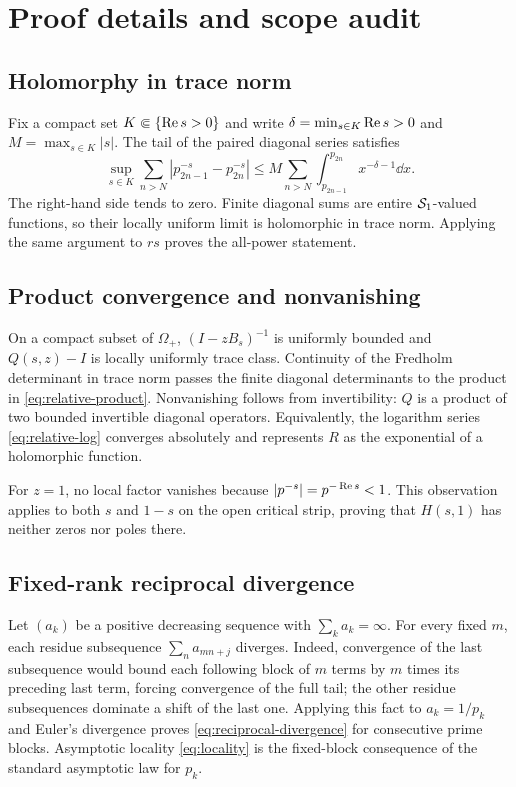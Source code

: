 \section{Proof details and scope audit}
\label{app:proofs}

\subsection{Holomorphy in trace norm}

Fix a compact set $K\Subset\{\operatorname{Re} s>0\}$ and write
$\delta=\min_{s\in K}\operatorname{Re} s>0$ and $M=\max_{s\in K}|s|$.  The tail of the
paired diagonal series satisfies
\[
 \sup_{s\in K}\sum_{n>N}|p_{2n-1}^{-s}-p_{2n}^{-s}|
 \le M\sum_{n>N}\int_{p_{2n-1}}^{p_{2n}}x^{-\delta-1}\dd x.       \tag{A.1}
\]
The right-hand side tends to zero.  Finite diagonal sums are entire
$\mathcal S_1$-valued functions, so their locally uniform limit is holomorphic in
trace norm.  Applying the same argument to $rs$ proves the all-power statement.

\subsection{Product convergence and nonvanishing}

On a compact subset of $\Omega_+$, $(I-zB_s)^{-1}$ is uniformly bounded and
$Q(s,z)-I$ is locally uniformly trace class.  Continuity of the Fredholm
determinant in trace norm passes the finite diagonal determinants to the
product in \cref{eq:relative-product}.  Nonvanishing follows from invertibility:
$Q$ is a product of two bounded invertible diagonal operators.  Equivalently,
the logarithm series \cref{eq:relative-log} converges absolutely and represents
$R$ as the exponential of a holomorphic function.

For $z=1$, no local factor vanishes because
$|p^{-s}|=p^{-\operatorname{Re} s}<1$.  This observation applies to both $s$ and $1-s$
on the open critical strip, proving that $H(s,1)$ has neither zeros nor poles
there.

\subsection{Fixed-rank reciprocal divergence}

Let $(a_k)$ be a positive decreasing sequence with $\sum_ka_k=\infty$.
For every fixed $m$, each residue subsequence
$\sum_na_{mn+j}$ diverges.  Indeed, convergence of the last subsequence would
bound each following block of $m$ terms by $m$ times its preceding last term,
forcing convergence of the full tail; the other residue subsequences dominate
a shift of the last one.  Applying this fact to $a_k=1/p_k$ and Euler's
divergence proves \cref{eq:reciprocal-divergence} for consecutive prime blocks.
Asymptotic locality \cref{eq:locality} is the fixed-block consequence of the
standard asymptotic law for $p_k$.

